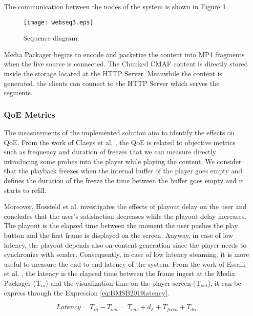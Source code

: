 The communication between the nodes of the system is shown in Figure \ref{fig:BMSB2019sequence}.

\begin{figure}[htp]
	\centering
	\texttt{[image: webseq3.eps]}
	\caption{Sequence diagram.}
	\label{fig:BMSB2019sequence}
\end{figure}

Media Packager begins to encode and packetize the content into MP4 fragments when the live source is connected.
The Chunked CMAF content is directly stored inside the storage located at the HTTP Server. Meanwhile the content is generated, the clients can connect to the HTTP Server which serves the segments.

\subsubsection{QoE Metrics}
\label{sec:BMSB2019measurement}

The measurements of the implemented solution aim to identify the effects on QoE. From the work of Claeys et al. \cite{claeys2014}, the QoE is related to objective metrics such as frequency and duration of freezes that we can measure directly introducing some probes into the player while playing the content. We consider that the playback freezes when the internal buffer of the player goes empty and defines the duration of the freeze the time between the buffer goes empty and it starts to refill.

Moreover, Hossfeld et al. \cite{hossfeld2012} investigates the effects of playout delay on the user and concludes that the user's satisfaction decreases while the playout delay increases. The playout is the elapsed time between the moment the user pushes the play button and the first frame is displayed on the screen. Anyway, in case of low latency, the playout depends also on content generation since the player needs to synchronize with sender. Consequently, in case of low latency steaming, it is more useful to measure the end-to-end latency of the system. From the work of Essaili et al. \cite{essaili2018}, the latency is the elapsed time between the frame ingest at the Media Packager (T$_{in}$) and the visualization time on the player screen (T$_{out}$), it can be express through the Expression \ref{eq:BMSB2019latency}.

\begin{equation}
\label{eq:BMSB2019latency}
Latency = T_{in} - T_{out} = T_{enc} + d_F + T_{fetch} + T_{dec}
\end{equation}


